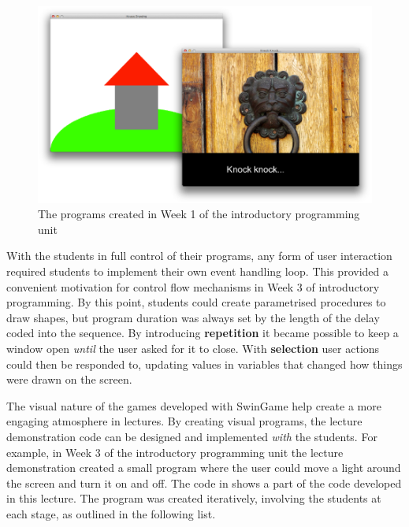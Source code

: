 \begin{figure}[thb]
  \centering
  \includegraphics[width=\textwidth]{Week1Progs}
  \caption{The programs created in Week 1 of the introductory programming unit}
  \label{fig:week1_progs}
\end{figure}

With the students in full control of their programs, any form of user interaction required students to implement their own event handling loop. This provided a convenient motivation for control flow mechanisms in Week 3 of introductory programming. By this point, students could create parametrised procedures to draw shapes, but program duration was always set by the length of the delay coded into the sequence. By introducing \textbf{repetition} it became possible to keep a window open \emph{until} the user asked for it to close. With \textbf{selection} user actions could then be responded to, updating values in variables that changed how things were drawn on the screen.

The visual nature of the games developed with SwinGame help create a more engaging atmosphere in lectures. By creating visual programs, the lecture demonstration code can be designed and implemented \emph{with} the students. For example, in Week 3 of the introductory programming unit the lecture demonstration created a small program where the user could move a light around the screen and turn it on and off. The code in  shows a part of the code developed in this lecture. The program was created iteratively, involving the students at each stage, as outlined in the following list.

